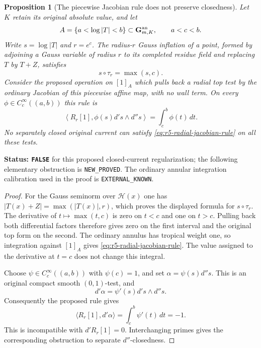 \documentclass[11pt,a4paper]{article}
\numberwithin{equation}{section}
\newtheorem{proposition}[theorem]{Proposition}
\theoremstyle{definition}
\theoremstyle{remark}
\begin{document}
\begin{proposition}[The piecewise Jacobian rule does not preserve closedness]
\label{prop:r5-gauss-pushforward-not-closed}
Let $K$ retain its original absolute value, and let
\[
 A=\{a<\log|T|<b\}\subset\mathbf G_{m,K}^{\rm an},
 \qquad a<c<b.
\]
Write $s=\log|T|$ and $r=e^c$.  The radius-$r$ Gauss inflation of
a point, formed by adjoining a Gauss variable of radius $r$ to its
completed residue field and replacing $T$ by $T+Z$, satisfies
\[
 s\circ\tau_r=\max(s,c).
\]
Consider the proposed operation on $[1]_A$ which pulls back a
radial top test by the ordinary Jacobian of this piecewise affine
map, with no wall term.  On every $\phi\in C_c^\infty((a,b))$ this
rule is
\begin{equation}
 \left\langle R_r[1],\phi(s)d's\wedge d''s\right\rangle
       =\int_c^b\phi(t)\,dt.
 \label{eq:r5-radial-jacobian-rule}
\end{equation}
No separately closed original current can satisfy
\eqref{eq:r5-radial-jacobian-rule} on all these tests.
\end{proposition}

\noindent\textbf{Status: \texttt{FALSE}} for this proposed
closed-current regularization; the following elementary obstruction
is \texttt{NEW\_PROVED}.  The ordinary annular integration
calibration used in the proof is \texttt{EXTERNAL\_KNOWN}.

\begin{proof}
For the Gauss seminorm over $\mathscr H(x)$ one has
$|T(x)+Z|=\max(|T(x)|,r)$, which proves the displayed formula for
$s\circ\tau_r$.  The derivative of $t\mapsto\max(t,c)$ is zero
on $t<c$ and one on $t>c$.  Pulling back both differential factors
therefore gives zero on the first interval and the original top
form on the second.  The ordinary annulus has tropical weight one,
so integration against $[1]_A$ gives
\eqref{eq:r5-radial-jacobian-rule}.  The value assigned to the
derivative at $t=c$ does not change this integral.

Choose $\psi\in C_c^\infty((a,b))$ with $\psi(c)=1$, and set
$\alpha=\psi(s)d''s$.  This is an original compact smooth
$(0,1)$-test, and
\[
 d'\alpha=\psi'(s)d's\wedge d''s.
\]
Consequently the proposed rule gives
\[
 \langle R_r[1],d'\alpha\rangle
       =\int_c^b\psi'(t)\,dt=-1.
\]
This is incompatible with $d'R_r[1]=0$.  Interchanging primes
gives the corresponding obstruction to separate $d''$-closedness.
\end{proof}
\end{document}
